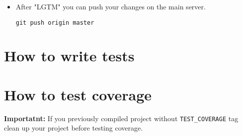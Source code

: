 \begin{itemize}
Click \textbf{Publish+Mail Comments} and fill the following parameters (see fig.~\ref{fig:codereview}):

\begin{itemize}
  \item Reviewers: \texttt{yulyugin@gmail.com, melges.morgen@gmail.com}
  \item CC: \texttt{mipt-smb-search-review@googlegroups.com}
  \item Description: \texttt{Description of your changes and testlog.}
\end{itemize}

\begin{figure}[htp]
  \centering
  \texttt{[image: ./codereview.png]}
  \caption{Codereview fields.}
  \label{fig:codereview}
\end{figure}

Then start codereview review by clicking \textbf{Publish all my drafts}.

\item After "LGTM" you can push your changes on the main server.

\begin{lstlisting}
git push origin master
\end{lstlisting}

\end{itemize}

\section{How to write tests}

\section{How to test coverage}

\textbf{Importatnt:} If you previously compiled project without \texttt{TEST\_COVERAGE} tag clean up your project before testing coverage.

